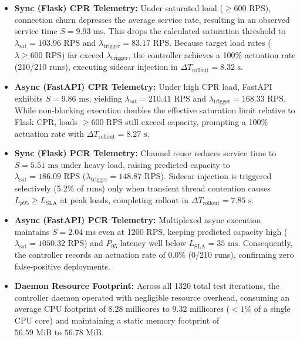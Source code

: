 \documentclass{ieeeaccess}
\begin{document}
\begin{itemize}
	\item \textbf{Sync (Flask) CPR Telemetry:} Under saturated load ($\ge 600\text{ RPS}$), connection churn depresses the average service rate, resulting in an observed service time $S = 9.93\text{ ms}$. This drops the calculated saturation threshold to $\lambda_{\text{sat}} = 103.96\text{ RPS}$ and $\lambda_{\text{trigger}} = 83.17\text{ RPS}$. Because target load rates ($\lambda \ge 600\text{ RPS}$) far exceed $\lambda_{\text{trigger}}$, the controller achieves a 100\% actuation rate (210/210 runs), executing sidecar injection in $\Delta T_{\text{rollout}} = 8.32\text{ s}$.
	
	\item \textbf{Async (FastAPI) CPR Telemetry:} Under high CPR load, FastAPI exhibits $S = 9.86\text{ ms}$, yielding $\lambda_{\text{sat}} = 210.41\text{ RPS}$ and $\lambda_{\text{trigger}} = 168.33\text{ RPS}$. While non-blocking execution doubles the effective saturation limit relative to Flask CPR, loads $\ge 600\text{ RPS}$ still exceed capacity, prompting a 100\% actuation rate with $\Delta T_{\text{rollout}} = 8.27\text{ s}$.
	
	\item \textbf{Sync (Flask) PCR Telemetry:} Channel reuse reduces service time to $S = 5.51\text{ ms}$ under heavy load, raising predicted capacity to $\lambda_{\text{sat}} = 186.09\text{ RPS}$ ($\lambda_{\text{trigger}} = 148.87\text{ RPS}$). Sidecar injection is triggered selectively (5.2\% of runs) only when transient thread contention causes $L_{p95} \ge L_{\text{SLA}}$ at peak loads, completing rollout in $\Delta T_{\text{rollout}} = 7.85\text{ s}$.
	
	\item \textbf{Async (FastAPI) PCR Telemetry:} Multiplexed async execution maintains $S = 2.04\text{ ms}$ even at 1200 RPS, keeping predicted capacity high ($\lambda_{\text{sat}} = 1050.32\text{ RPS}$) and $P_{95}$ latency well below $L_{\text{SLA}} = 35\text{ ms}$. Consequently, the controller records an actuation rate of 0.0\% (0/210 runs), confirming zero false-positive deployments.
	
	\item \textbf{Daemon Resource Footprint:} Across all 1320 total test iterations, the controller daemon operated with negligible resource overhead, consuming an average CPU footprint of $8.28\text{ millicores } \text{to } 9.32\text{ millicores}$ ($< 1\%$ of a single CPU core) and maintaining a static memory footprint of $56.59\text{ MiB } \text{to } 56.78\text{ MiB}$.
\end{itemize}
\end{document}
